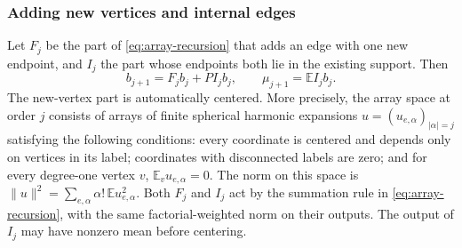 \documentclass[11pt,reqno]{amsart}
\numberwithin{equation}{section}
\theoremstyle{definition}
\theoremstyle{remark}
\theoremstyle{definition}
\begin{document}
\subsubsection{Adding new vertices and internal edges}
Let $F_j$ be the part of \eqref{eq:array-recursion} that adds an edge with one new endpoint,
and $I_j$ the part whose endpoints both lie in the existing support. Then
\begin{equation}\label{eq:FI}
 b_{j+1}=F_jb_j+PI_jb_j,\qquad \mu_{j+1}=\mathbb E I_jb_j.
\end{equation}
The new-vertex part is automatically centered. More precisely, the array space at order $j$ consists of
arrays of finite spherical harmonic expansions $u=(u_{e,\alpha})_{|\alpha|=j}$ satisfying the following conditions: every coordinate is centered
and depends only on vertices in its label; coordinates with disconnected labels are zero; and for every degree-one vertex $v$,
$\mathbb E_vu_{e,\alpha}=0$. The norm on this space is
$\|u\|^2=\sum_{e,\alpha}\alpha!\,\mathbb E u_{e,\alpha}^2$.
Both $F_j$ and $I_j$ act by the summation rule in \eqref{eq:array-recursion},
with the same factorial-weighted norm on their outputs. The output of $I_j$ may have nonzero mean before centering.
\end{document}
